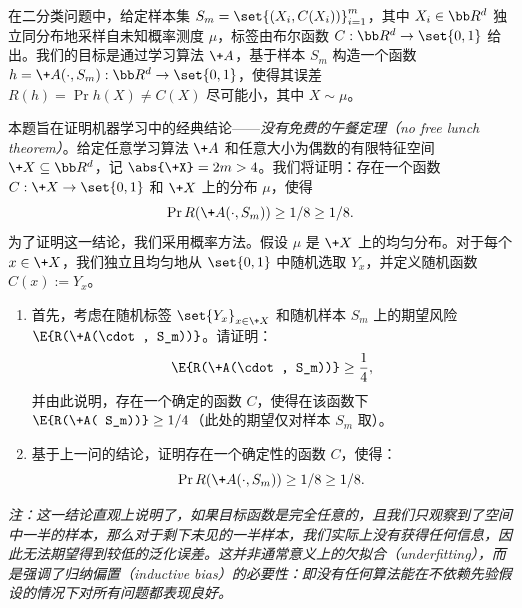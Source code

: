 \begin{problem}
    在二分类问题中，给定样本集 $S_m = \set{(X_i, C(X_i))}_{i=1}^m$，其中 $X_i \in \bb R^d$ 独立同分布地采样自未知概率测度 $\mu$，标签由布尔函数 $C: \bb R^d \to \set{0, 1}$ 给出。我们的目标是通过学习算法 $\+A$，基于样本 $S_m$ 构造一个函数 $h = \+A(\cdot, S_m): \bb R^d \to \set{0, 1}$，使得其误差 $R(h) = \Pr{h(X) \neq C(X)}$ 尽可能小，其中 $X \sim \mu$。

    本题旨在证明机器学习中的经典结论——\emph{没有免费的午餐定理（no free lunch theorem）}。给定任意学习算法 $\+A$ 和任意大小为偶数的有限特征空间 $\+X \subseteq \bb R^d$，记 $\abs{\+X} = 2m > 4$。我们将证明：存在一个函数 $C: \+X \to \set{0, 1}$ 和 $\+X$ 上的分布 $\mu$，使得
    \[
        \Pr{R(\+A(\cdot, S_m)) \ge 1/8} \ge 1/8.
    \]
    为了证明这一结论，我们采用概率方法。假设 $\mu$ 是 $\+X$ 上的均匀分布。对于每个 $x \in \+X$，我们独立且均匀地从 $\set{0, 1}$ 中随机选取 $Y_x$，并定义随机函数 $C(x) := Y_x$。

    \begin{enumerate}
        \item 首先，考虑在随机标签 $\set{Y_x}_{x \in \+X}$ 和随机样本 $S_m$ 上的期望风险 $\E{R(\+A(\cdot, S_m))}$。请证明：
        \[
            \E{R(\+A(\cdot, S_m))} \ge \frac{1}{4},
        \]
        并由此说明，存在一个确定的函数 $C$，使得在该函数下 $\E{R(\+A( S_m))} \ge 1/4$（此处的期望仅对样本 $S_m$ 取）。
        \item 基于上一问的结论，证明存在一个确定性的函数 $C$，使得：
        \[
            \Pr{R(\+A(\cdot, S_m)) \ge 1/8} \ge 1/8.
        \]
    \end{enumerate}

    \textit{注：这一结论直观上说明了，如果目标函数是完全任意的，且我们只观察到了空间中一半的样本，那么对于剩下未见的一半样本，我们实际上没有获得任何信息，因此无法期望得到较低的泛化误差。这并非通常意义上的欠拟合（underfitting），而是强调了\emph{归纳偏置（inductive bias）}的必要性：即没有任何算法能在不依赖先验假设的情况下对所有问题都表现良好。}
\end{problem}
